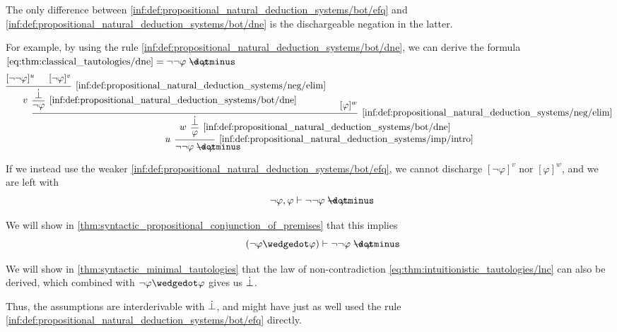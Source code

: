 \begin{example}\label{ex:natural_deduction_efq_vs_dne}
  The only difference between \ref{inf:def:propositional_natural_deduction_systems/bot/efq} and \ref{inf:def:propositional_natural_deduction_systems/bot/dne} is the dischargeable negation in the latter.

  For example, by using the rule \ref{inf:def:propositional_natural_deduction_systems/bot/dne}, we can derive the formula \( \eqref{eq:thm:classical_tautologies/dne} = \neg \neg \varphi \synimplies \varphi \):
  \begin{equation*}
    \begin{prooftree}
      \hypo{ [\neg\neg\varphi]^u }
      \hypo{ [\neg\varphi]^v }
      \infer2[\ref{inf:def:propositional_natural_deduction_systems/neg/elim}]{ \synbot }
      \infer[left label=\( v \)]1[\ref{inf:def:propositional_natural_deduction_systems/bot/dne}]{ \neg\varphi }

      \hypo{ [\varphi]^w }
      \infer2[\ref{inf:def:propositional_natural_deduction_systems/neg/elim}]{ \synbot }
      \infer[left label=\( w \)]1[\ref{inf:def:propositional_natural_deduction_systems/bot/dne}]{ \varphi }
      \infer[left label=\( u \)]1[\ref{inf:def:propositional_natural_deduction_systems/imp/intro}]{ \neg\neg\varphi \synimplies \varphi }
    \end{prooftree}
  \end{equation*}

  If we instead use the weaker \ref{inf:def:propositional_natural_deduction_systems/bot/efq}, we cannot discharge \( [\neg\varphi]^v \) nor \( [\varphi]^w \), and we are left with
  \begin{equation*}
    \neg\varphi, \varphi \vdash \neg\neg\varphi \synimplies \varphi.
  \end{equation*}

  We will show in \cref{thm:syntactic_propositional_conjunction_of_premises} that this implies
  \begin{equation*}
    (\neg\varphi \synwedge \varphi) \vdash \neg\neg\varphi \synimplies \varphi
  \end{equation*}

  We will show in \cref{thm:syntactic_minimal_tautologies} that the law of non-contradiction \eqref{eq:thm:intuitionistic_tautologies/lnc} can also be derived, which combined with \( \neg\varphi \synwedge \varphi \) gives us \( \dot{\bot} \).

  Thus, the assumptions are interderivable with \( \dot{\bot} \), and might have just as well used the rule \ref{inf:def:propositional_natural_deduction_systems/bot/efq} directly.
\end{example}

